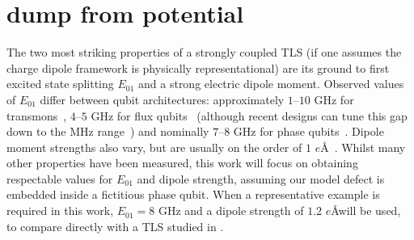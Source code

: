 
\section{dump from potential}
The two most striking properties of a strongly coupled TLS (if one assumes the charge dipole framework is physically representational) are its ground to first excited state splitting $E_{01}$ and a strong electric dipole moment.
Observed values of $E_{01}$  differ between qubit architectures: approximately $1$--$10$ GHz for transmons~\cite{Koch2007}, $4$--$5$ GHz for flux qubits~\cite{Lupascu2009} (although recent designs can tune this gap down to the MHz range~\cite{Schwarz2013}) and nominally $7$--$8$ GHz for phase qubits~\cite{Cole2010}.
Dipole moment strengths also vary, but are usually on the order of $1$ $e$\AA~\cite{Cole2010,Shalibo2010}.
Whilst many other properties have been measured, this work will focus on obtaining respectable values for $E_{01}$ and dipole strength, assuming our model defect is embedded inside a fictitious phase qubit.
When a representative example is required in this work, $E_{01}=8$ GHz and a dipole strength of $1.2$ $e$\AA will be used, to compare directly with a TLS studied in .



